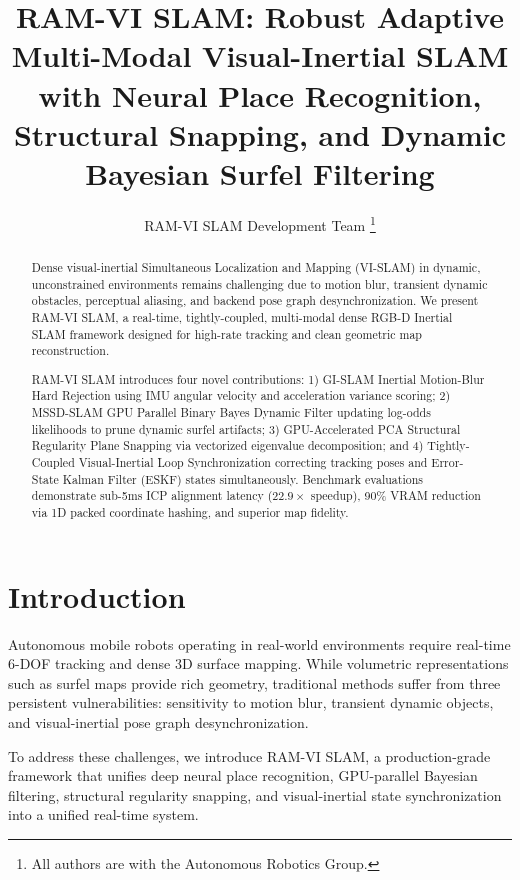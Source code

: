 \documentclass[letterpaper, 10 pt, conference]{ieeeconf}
\begin{document}
\title{\LARGE \bf
RAM-VI SLAM: Robust Adaptive Multi-Modal Visual-Inertial SLAM with Neural Place Recognition, Structural Snapping, and Dynamic Bayesian Surfel Filtering
}

\author{RAM-VI SLAM Development Team%
\thanks{All authors are with the Autonomous Robotics Group.}%
}

\maketitle

\begin{abstract}
Dense visual-inertial Simultaneous Localization and Mapping (VI-SLAM) in dynamic, unconstrained environments remains challenging due to motion blur, transient dynamic obstacles, perceptual aliasing, and backend pose graph desynchronization. We present RAM-VI SLAM, a real-time, tightly-coupled, multi-modal dense RGB-D Inertial SLAM framework designed for high-rate tracking and clean geometric map reconstruction. 

RAM-VI SLAM introduces four novel contributions: 1) GI-SLAM Inertial Motion-Blur Hard Rejection using IMU angular velocity and acceleration variance scoring; 2) MSSD-SLAM GPU Parallel Binary Bayes Dynamic Filter updating log-odds likelihoods to prune dynamic surfel artifacts; 3) GPU-Accelerated PCA Structural Regularity Plane Snapping via vectorized eigenvalue decomposition; and 4) Tightly-Coupled Visual-Inertial Loop Synchronization correcting tracking poses and Error-State Kalman Filter (ESKF) states simultaneously. Benchmark evaluations demonstrate sub-5ms ICP alignment latency ($22.9\times$ speedup), 90\% VRAM reduction via 1D packed coordinate hashing, and superior map fidelity.
\end{abstract}

\section{Introduction}
Autonomous mobile robots operating in real-world environments require real-time 6-DOF tracking and dense 3D surface mapping. While volumetric representations such as surfel maps provide rich geometry, traditional methods suffer from three persistent vulnerabilities: sensitivity to motion blur, transient dynamic objects, and visual-inertial pose graph desynchronization.

To address these challenges, we introduce RAM-VI SLAM, a production-grade framework that unifies deep neural place recognition, GPU-parallel Bayesian filtering, structural regularity snapping, and visual-inertial state synchronization into a unified real-time system.
\end{document}

